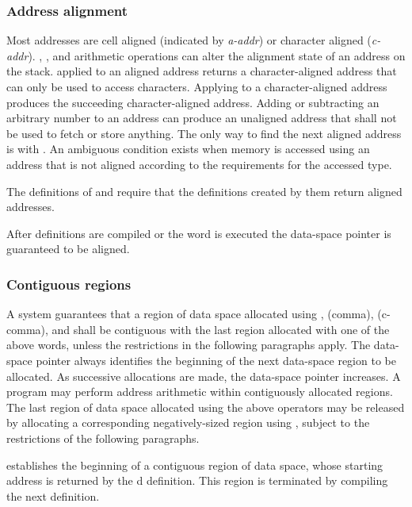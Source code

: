\subsubsection{Address alignment} %
\label{usage:aaddr}

Most addresses are cell aligned (indicated by \emph{a-addr}) or character
aligned (\emph{c-addr}).
, , and arithmetic operations can alter
the alignment state of an address on the stack.  applied
to an aligned address returns a character-aligned address that can
only be used to access characters. Applying  to a
character-aligned address produces the succeeding character-aligned
address. Adding or subtracting an arbitrary number to an address can
produce an unaligned address that shall not be used to fetch or
store anything. The only way to find the next aligned address is
with .
An ambiguous condition exists when memory is accessed using an
address that is not aligned according to the requirements for
the accessed type.

The definitions of  and
 require that the definitions created
by them return aligned addresses.

After definitions are compiled or the word  is executed
the data-space pointer is guaranteed to be aligned.

\subsubsection{Contiguous regions} %
\label{usage:contiguous}

A system guarantees that a region of data space allocated using
, \word{,} (comma),  (c-comma), and
 shall be contiguous with the last region allocated
with one of the above words, unless the restrictions in the
following paragraphs apply. The data-space pointer 
always identifies the beginning of the next data-space region to be
allocated. As successive allocations are made, the data-space
pointer increases. A program may perform address arithmetic within
contiguously allocated regions. The last region of data space
allocated using the above operators may be released by allocating a
corresponding negatively-sized region using , subject
to the restrictions of the following paragraphs.

 establishes the beginning of a contiguous region of
data space, whose starting address is returned by the d
definition. This region is terminated by compiling the next
definition.

